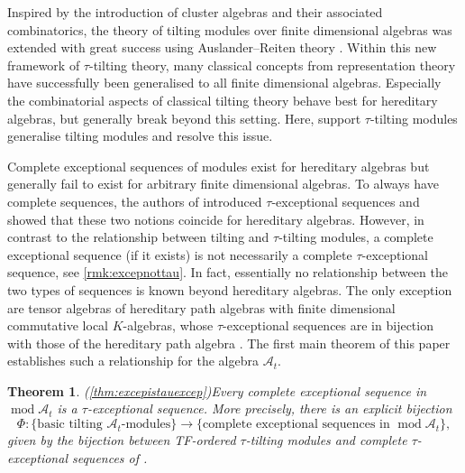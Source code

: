 \documentclass[10pt,twoside, a4paper,reqno]{amsart}
\DeclareMathOperator{\mods}{mod}
\newcommand{\A}{\mathscr{A}}
\newtheorem{theorem}{Theorem}[section]
\theoremstyle{definition}
\begin{document}
Inspired by the introduction of cluster algebras \cite{FZ2002} and their associated combinatorics, the theory of tilting modules over finite dimensional algebras was extended with great success using Auslander--Reiten theory \cite{AIR2014}. Within this new framework of $\tau$-tilting theory, many classical concepts from representation theory have successfully been generalised to all finite dimensional algebras. Especially the combinatorial aspects of classical tilting theory behave best for hereditary algebras, but generally break beyond this setting. Here, support $\tau$-tilting modules generalise tilting modules and resolve this issue. 

Complete exceptional sequences of modules exist for hereditary algebras \cite{cbw92} but generally fail to exist for arbitrary finite dimensional algebras. To always have complete sequences, the authors of \cite{BuanMarsh2018t} introduced $\tau$-exceptional sequences and showed that these two notions coincide for hereditary algebras. However, in contrast to the relationship between tilting and $\tau$-tilting modules, a complete exceptional sequence (if it exists) is not necessarily a complete $\tau$-exceptional sequence, see \cref{rmk:excepnottau}. In fact, essentially no relationship between the two types of sequences is known beyond hereditary algebras. The only exception are tensor algebras of hereditary path algebras with finite dimensional commutative local $K$-algebras, whose $\tau$-exceptional sequences are in bijection with those of the hereditary path algebra \cite{Nonis2025}. The first main theorem of this paper establishes such a relationship for the algebra $\A_t$.




\begin{theorem}(\cref{thm:excepistauexcep})\label{thm:introthm1}
    Every complete exceptional sequence in $\mods \A_t$ is a $\tau$-exceptional sequence. More precisely, there is an explicit bijection 
    \[ \Phi: \{ \text{basic tilting $\A_t$-modules} \} \longrightarrow \{ \text{complete exceptional sequences in $\mods \A_t$} \}, \]
    given by the bijection between TF-ordered $\tau$-tilting modules and complete $\tau$-exceptional sequences of \cite{MendozaTreffinger}.
\end{theorem}
\end{document}
